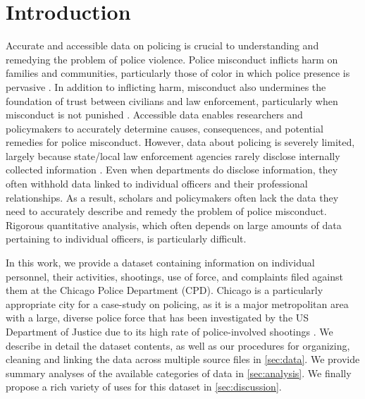 

\section{Introduction} \label{sec:intro}
Accurate and accessible data on policing is crucial to understanding and
remedying the problem of police violence. Police misconduct inflicts harm on
families and communities, particularly those of color in which police presence
is pervasive \cite{Alang17}. In addition to inflicting harm, misconduct also
undermines the foundation of trust between civilians and law enforcement,
particularly when misconduct is not punished \cite{Desmond16}. Accessible data
enables researchers and policymakers to accurately determine causes,
consequences, and potential remedies for police misconduct.
However, data about policing is severely limited, largely because state/local law
enforcement agencies rarely disclose internally collected information
\cite{Jackman21}. Even when departments do disclose information, they often
withhold data linked to individual officers and their professional
relationships.  As a result, scholars and policymakers often
lack the data they need to accurately describe and remedy the problem of police
misconduct.  Rigorous quantitative analysis, which often depends on large
amounts of data pertaining to individual officers, is particularly difficult.

In this work, we provide a dataset containing information on individual
personnel, their activities, shootings, use of force, and complaints filed against them at
the Chicago Police Department (CPD). Chicago is a particularly appropriate
city for a case-study on policing, as it is a major metropolitan area with a
large, diverse police force that has been investigated by the US Department of
Justice due to its high rate of police-involved shootings \cite{DoJ17}. We
describe in detail the dataset contents, as well as 
our procedures for organizing, cleaning and linking the data across multiple
source files in \cref{sec:data}. We provide summary analyses of the
available categories of data in \cref{sec:analysis}.
We finally propose a rich variety of uses for this dataset in \cref{sec:discussion}.


